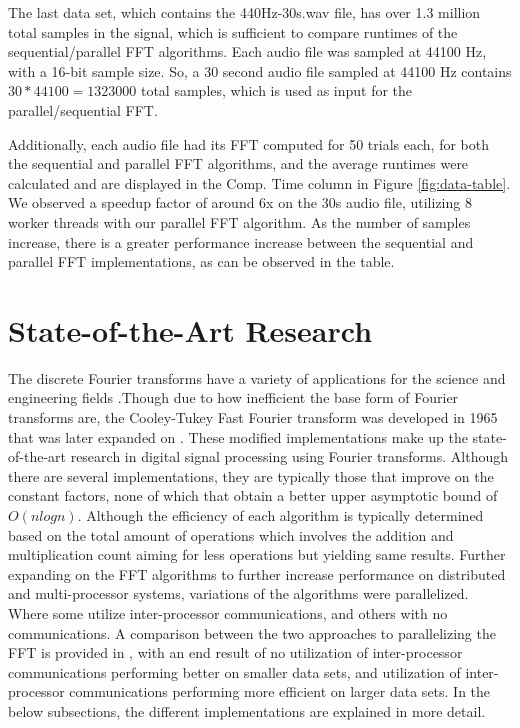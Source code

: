 \documentclass[journal]{IEEEtran}
\begin{document}
	\vspace{1em}
	\par{
		The last data set, which contains the 440Hz-30s.wav file, has over
		1.3 million total samples in the signal, which is sufficient
		to compare runtimes of the sequential/parallel FFT algorithms. Each
		audio file was sampled at 44100 Hz, with a 16-bit sample size. So, a 30
		second audio file sampled at 44100 Hz contains $30 * 44100 = 1323000$
		total samples, which is used as input for the parallel/sequential FFT.
	}
	\par{
		Additionally, each audio file had its FFT computed for 50 trials each, 
		for both the sequential and parallel FFT algorithms, and the 
		average runtimes were calculated and are displayed in the Comp. Time 
		column in Figure \ref{fig:data-table}. We observed a speedup factor of 
		around 6x on the 30s audio file, utilizing 8 worker threads with our 
		parallel FFT algorithm. As the number of samples increase, 
		there is a greater performance increase between the sequential and 
		parallel FFT implementations, as can be observed in the table.
	}

\section{State-of-the-Art Research}


	\par {
		The discrete Fourier transforms have a variety of applications for the 
		science and engineering fields \cite{Xiang}.Though due to how inefficient 
		the base form of Fourier transforms are, the Cooley-Tukey Fast Fourier transform 
		was developed in 1965 that was later expanded on \cite{CTA}. These modified implementations 
		make up the state-of-the-art research in digital signal processing using Fourier transforms. 
		Although there are several implementations, they are typically those that improve on the constant 
		factors, none of which that obtain a better upper asymptotic bound of $O(nlogn)$. Although 
		the efficiency of each algorithm is typically determined based on the total amount of operations which 
		involves the addition and multiplication count aiming for less operations but yielding same results. 
		Further expanding on the FFT algorithms to further increase performance on distributed and multi-processor systems, variations of the algorithms 
		were parallelized. Where some utilize inter-processor communications, and others with no communications. 
		A comparison between the two approaches to parallelizing the FFT is provided in \cite{Pan}, with an 
		end result of no utilization of inter-processor communications performing better on smaller data sets, and utilization of inter-processor communications 
		performing more efficient on larger data sets. In the below subsections, the different implementations 
		are explained in more detail.
	}
\end{document}
